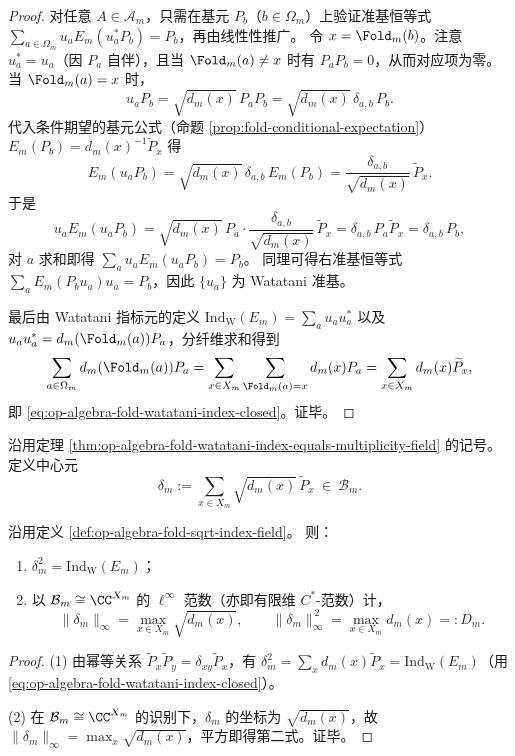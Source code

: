 \begin{proof}
对任意 \(A\in\mathcal{A}_m\)，只需在基元 \(P_b\)（\(b\in\Omega_m\)）上验证准基恒等式
\(
\sum_{a\in\Omega_m}u_a E_m(u_a^\ast P_b)=P_b
\)，再由线性性推广。
令 \(x=\Fold_m(b)\)。注意 \(u_a^\ast=u_a\)（因 \(P_a\) 自伴），且当 \(\Fold_m(a)\neq x\) 时有 \(P_aP_b=0\)，从而对应项为零。
当 \(\Fold_m(a)=x\) 时，
\[
u_aP_b=\sqrt{d_m(x)}\,P_aP_b=\sqrt{d_m(x)}\,\delta_{a,b}\,P_b.
\]
代入条件期望的基元公式（命题 \ref{prop:fold-conditional-expectation}）
\(
E_m(P_b)=d_m(x)^{-1}\widetilde P_x
\)
得
\[
E_m(u_aP_b)
=\sqrt{d_m(x)}\,\delta_{a,b}\,E_m(P_b)
=\frac{\delta_{a,b}}{\sqrt{d_m(x)}}\,\widetilde P_x.
\]
于是
\[
u_aE_m(u_aP_b)
=\sqrt{d_m(x)}\,P_a\cdot \frac{\delta_{a,b}}{\sqrt{d_m(x)}}\,\widetilde P_x
=\delta_{a,b}\,P_a\widetilde P_x
=\delta_{a,b}\,P_b,
\]
对 \(a\) 求和即得 \(\sum_a u_aE_m(u_aP_b)=P_b\)。
同理可得右准基恒等式 \(\sum_a E_m(P_bu_a)u_a=P_b\)，因此 \(\{u_a\}\) 为 Watatani 准基。

最后由 Watatani 指标元的定义
\(
\mathrm{Ind}_{\mathrm{W}}(E_m)=\sum_a u_a u_a^\ast
\)
以及 \(u_a u_a^\ast=d_m(\Fold_m(a))P_a\)，分纤维求和得到
\[
\sum_{a\in\Omega_m} d_m(\Fold_m(a))P_a
=\sum_{x\in X_m}\sum_{\Fold_m(a)=x} d_m(x)P_a
=\sum_{x\in X_m} d_m(x)\widetilde P_x,
\]
即 \eqref{eq:op-algebra-fold-watatani-index-closed}。证毕。
\end{proof}

\begin{definition}[平方根指数场]\label{def:op-algebra-fold-sqrt-index-field}
沿用定理 \ref{thm:op-algebra-fold-watatani-index-equals-multiplicity-field} 的记号。
定义中心元
\[
\delta_m:=\sum_{x\in X_m}\sqrt{d_m(x)}\,\widetilde P_x\ \in\ \mathcal{B}_m.
\]
\end{definition}

\begin{proposition}[平方根指数场的基本性质]\label{prop:op-algebra-fold-sqrt-index-field-basic}
沿用定义 \ref{def:op-algebra-fold-sqrt-index-field}。
则：
\begin{enumerate}
  \item \(\delta_m^2=\mathrm{Ind}_{\mathrm{W}}(E_m)\)；
  \item 以 \(\mathcal{B}_m\cong \CC^{X_m}\) 的 \(\ell^\infty\) 范数（亦即有限维 \(C^\ast\)-范数）计，
  \[
  \|\delta_m\|_\infty=\max_{x\in X_m}\sqrt{d_m(x)},
  \qquad
  \|\delta_m\|_\infty^{\,2}=\max_{x\in X_m}d_m(x)=:D_m.
  \]
\end{enumerate}
\end{proposition}
\begin{proof}
(1) 由幂等关系 \(\widetilde P_x\widetilde P_y=\delta_{xy}\widetilde P_x\)，有
\(
\delta_m^2=\sum_x d_m(x)\widetilde P_x=\mathrm{Ind}_{\mathrm W}(E_m)
\)（用 \eqref{eq:op-algebra-fold-watatani-index-closed}）。
\par
(2) 在 \(\mathcal{B}_m\cong \CC^{X_m}\) 的识别下，\(\delta_m\) 的坐标为 \(\sqrt{d_m(x)}\)，故 \(\|\delta_m\|_\infty=\max_x\sqrt{d_m(x)}\)，平方即得第二式。证毕。
\end{proof}

